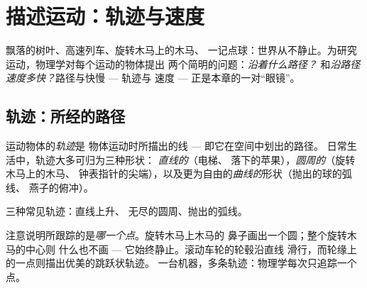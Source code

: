 \chapter{描述运动：轨迹与速度}\label{ch:g6:describing-motion}

飘落的树叶、高速列车、旋转木马上的木马、
一记点球：世界从不静止。为研究运动，物理学对每个运动的物体提出
两个简明的问题：\emph{沿着什么路径？}
和\emph{沿路径速度多快？}路径与快慢 --- 轨迹与
速度 --- 正是本章的一对“眼镜”。

\section{轨迹：所经的路径}

\begin{definition}[轨迹]\label{def:g6:describing-motion:trajectory}
运动物体的\emph{轨迹}是
物体运动时所描出的线 --- 即它在空间中划出的路径。
日常生活中，轨迹大多可归为三种形状：
\emph{直线的}（电梯、
落下的苹果），\emph{圆周的}（旋转木马上的木马、
钟表指针的尖端），以及更为自由的\emph{曲线的}形状（抛出的球的弧线、
燕子的俯冲）。
\end{definition}

\begin{omfigure}

{\small 三种常见轨迹：直线上升、
无尽的圆周、抛出的弧线。}
\end{omfigure}

\begin{example}[谁的轨迹？]\label{ex:g6:describing-motion:whose}
注意说明所跟踪的是\emph{哪一个点}。旋转木马上木马的
鼻子画出一个圆；整个旋转木马的中心则
什么也不画 --- 它始终静止。滚动车轮的轮毂沿直线
滑行，而轮缘上的一点则描出优美的跳跃状轨迹。
一台机器，多条轨迹：物理学每次只追踪一个点。
\end{example}

